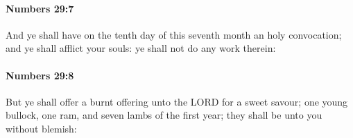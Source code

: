 		\paragraph{Numbers 29:7} %
			\label{NUMBERS-29-7}

			And ye shall have on the tenth day of this seventh month an holy convocation; and ye shall afflict your souls: ye shall not do any work therein:


		\paragraph{Numbers 29:8} %
			\label{NUMBERS-29-8}

			But ye shall offer a burnt offering unto the LORD for a sweet savour; one young bullock, one ram, and seven lambs of the first year; they shall be unto you without blemish:


